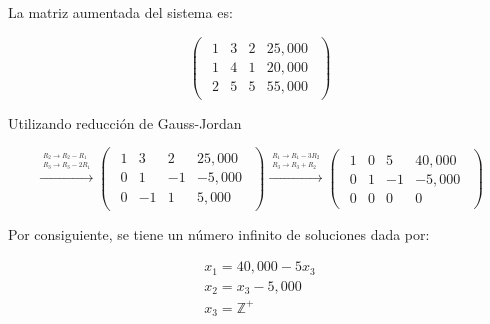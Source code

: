 \documentclass{article}
\begin{document}
La matriz aumentada del sistema es:

\begin{equation*}
    \begin{pmatrix}
        \begin{array}{rrr|r}
            1 & 3 & 2 & 25,000\\
            1 & 4 & 1 & 20,000 \\
            2 & 5 & 5 & 55,000
        \end{array}
    \end{pmatrix}
\end{equation*}

Utilizando reducción de Gauss-Jordan

\begin{equation*}
    \xrightarrow{\overset{\begin{aligned} R_2 \rightarrow R_2 - R_1 \\ R_3 \rightarrow R_3 - 2R_1\end{aligned}}{}} 
    \begin{pmatrix}
        \begin{array}{rrr|r}
            1& 3 & 2 & 25,000\\
            0 & 1 &-1 &-5,000 \\
            0 & -1 & 1 & 5,000
        \end{array}
    \end{pmatrix}
    \xrightarrow{\overset{\begin{aligned} R_1 \rightarrow R_1 - 3R_2 \\ R_3 \rightarrow R_3 + R_2\end{aligned}}{}} 
    \begin{pmatrix}
        \begin{array}{rrr|r}
            1 & 0 & 5 & 40,000\\
            0 & 1 & -1 & -5,000\\
            0 & 0 & 0 & 0
        \end{array}
    \end{pmatrix}
\end{equation*}

Por consiguiente, se tiene un número infinito de soluciones dada por: 

\begin{equation*}
    \begin{aligned}
        x_1 = 40,000 - 5x_3\\
        x_2 = x_3 - 5,000\\
        x_3 = \mathbb{Z}^+
    \end{aligned}
\end{equation*}
\end{document}
